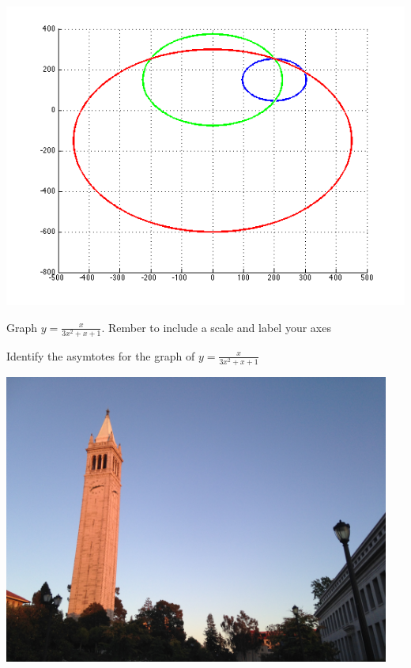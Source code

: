 \documentclass[11pt]{article}
\def\eq1{y=\frac{x}{3x^2+x+1}}
\def\labellaxes{Rember to include a scale and label your axes}
\begin{document}
\begin{center}\includegraphics{p2.png}
\end{center}

%    
%    
     
     Graph $\eq1$. \labellaxes

     
     Identify the asymtotes for the graph of $\eq1$
     
     \includegraphics[width=5in]{IMG_0504}
    
    
\end{document}
